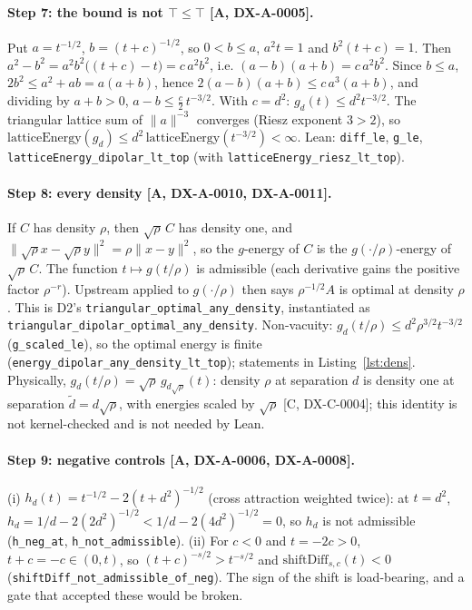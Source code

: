 \documentclass[11pt]{article}
\theoremstyle{remark}
\newcommand{\tier}[1]{\textsf{[#1]}}
\newcommand{\lean}[1]{\texttt{#1}}
\newcommand{\dt}{\tilde d}
\begin{document}
\paragraph{Step 7: the bound is not $\top\le\top$ \tier{A, DX-A-0005}.} Put $a=t^{-1/2}$, $b=(t+c)^{-1/2}$, so
$0<b\le a$, $a^2t=1$ and $b^2(t+c)=1$. Then $a^2-b^2=a^2b^2\bigl((t+c)-t\bigr)=c\,a^2b^2$, i.e.
$(a-b)(a+b)=c\,a^2b^2$. Since $b\le a$, $2b^2\le a^2+ab=a(a+b)$, hence $2(a-b)(a+b)\le c\,a^3(a+b)$, and dividing by
$a+b>0$, $a-b\le\tfrac c2\,t^{-3/2}$. With $c=d^2$: $g_d(t)\le d^2t^{-3/2}$. The triangular lattice sum of
$\|a\|^{-3}$ converges (Riesz exponent $3>2$), so $\mathrm{latticeEnergy}(g_d)\le d^2\,\mathrm{latticeEnergy}(t^{-3/2})<\infty$.
Lean: \lean{diff\_le}, \lean{g\_le}, \lean{latticeEnergy\_dipolar\_lt\_top} (with \lean{latticeEnergy\_riesz\_lt\_top}).

\paragraph{Step 8: every density \tier{A, DX-A-0010, DX-A-0011}.} If $C$ has density $\rho$, then $\sqrt\rho\,C$ has density
one, and $\|\sqrt\rho x-\sqrt\rho y\|^2=\rho\|x-y\|^2$, so the $g$-energy of $C$ is the $g(\cdot/\rho)$-energy of
$\sqrt\rho\,C$. The function $t\mapsto g(t/\rho)$ is admissible (each derivative gains the positive factor $\rho^{-r}$).
Upstream applied to $g(\cdot/\rho)$ then says $\rho^{-1/2}A$ is optimal at density $\rho$. This is D2's
\lean{triangular\_optimal\_any\_density}, instantiated as \lean{triangular\_dipolar\_optimal\_any\_density}. Non-vacuity:
$g_d(t/\rho)\le d^2\rho^{3/2}t^{-3/2}$ (\lean{g\_scaled\_le}), so the optimal energy is finite
(\lean{energy\_dipolar\_any\_density\_lt\_top}); statements in Listing~\ref{lst:dens}. Physically, $g_d(t/\rho)=\sqrt\rho\,g_{d\sqrt\rho}(t)$: density $\rho$
at separation $d$ is density one at separation $\dt=d\sqrt\rho$, with energies scaled by $\sqrt\rho$
\tier{C, DX-C-0004}; this identity is not kernel-checked and is not needed by Lean.

\paragraph{Step 9: negative controls \tier{A, DX-A-0006, DX-A-0008}.} (i) $h_d(t)=t^{-1/2}-2(t+d^2)^{-1/2}$ (cross
attraction weighted twice): at $t=d^2$, $h_d=1/d-2(2d^2)^{-1/2}<1/d-2(4d^2)^{-1/2}=0$, so $h_d$ is not admissible
(\lean{h\_neg\_at}, \lean{h\_not\_admissible}). (ii) For $c<0$ and $t=-2c>0$, $t+c=-c\in(0,t)$, so
$(t+c)^{-s/2}>t^{-s/2}$ and $\mathrm{shiftDiff}_{s,c}(t)<0$ (\lean{shiftDiff\_not\_admissible\_of\_neg}). The sign
of the shift is load-bearing, and a gate that accepted these would be broken.
\end{document}
